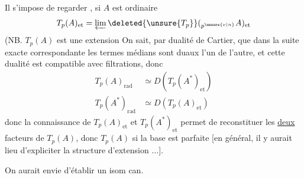 Il s'impose de regarder , si $A$ est ordinaire
\[
T_p(A)_{\text{et}}=\varprojlim\deleted{\unsure{T_p}}({}_{p^{\unsure{\nu|n}}}A)_{\text{et}}
\]
(NB. $T_p(A)$ est une extension
On sait, par dualité de Cartier, que dans la suite exacte correspondante
les termes médians sont duaux l'un de l'autre, et  cette dualité est compatible avec filtrations, donc
\[
\begin{aligned}
T_p(A)_{\mathrm{rad}}&\simeq D(T_p(A^*)_{\text{et}})\\
T_p(A^*)_{\mathrm{rad}}&\simeq D(T_p(A)_{\text{et}})
\end{aligned}
\]
donc la connaissance de $T_p(A)_{\text{et}}$ et $T_p(A^*)_{\text{et}}$ permet de reconstituer les \uline{deux} facteurs de $T_p(A)$, donc $T_p(A)$ si la base est parfaite [en général, il y aurait lieu d'expliciter la structure d'extension $\ldots$].

On aurait envie d'établir un isom can. 
